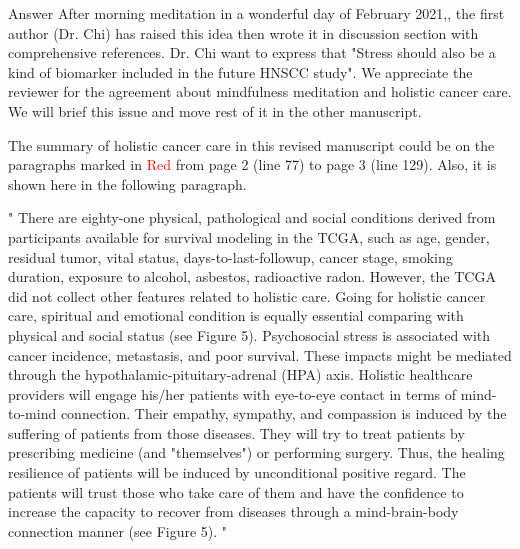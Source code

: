 \documentclass[preprint,12pt]{elsarticle}
\newenvironment{MyColorPar}[1]{%
    \leavevmode\color{#1}\ignorespaces%
}{%
}%
\begin{document}

\begin{MyColorPar}{blue}
Answer
After morning meditation in a wonderful day of February 2021,, the first author (Dr. Chi) has raised this idea then wrote it in discussion section with comprehensive references. Dr. Chi want to express that "Stress should also be a kind of biomarker included in the future HNSCC study".
We appreciate the reviewer for the agreement about mindfulness meditation and holistic cancer care. We will brief this issue and move rest of it in the other manuscript.

The summary of holistic cancer care in this revised manuscript could be on the paragraphs marked in \textcolor{red}{Red} from page 2 (line 77) to page 3 (line 129). Also, it is shown here in the following paragraph.

\begin{MyColorPar}{red}
"%
There are eighty-one physical, pathological and social conditions derived from participants available for survival modeling in the TCGA, %
such as age, gender, residual tumor, vital status, days-to-last-followup, cancer stage, smoking duration, exposure to alcohol, asbestos, radioactive radon. 
However, the TCGA did not collect other features related to holistic care.
Going for holistic cancer care\cite{Mehta2019}\cite{Iftikhar2021}, spiritual and emotional condition is equally essential comparing with physical and social status (see Figure 5).%
Psychosocial stress is associated with cancer incidence\cite{Lutgendorf2010}\cite{Powell2013}\cite{Iftikhar2021}, metastasis\cite{Lutgendorf2010}\cite{Moreno-Smith2010}\cite{Du2020}\cite{Xu2021}, and poor survival\cite{Chida2008}.
These impacts might be mediated through the hypothalamic-pituitary-adrenal (HPA) axis\cite{Hsiao2012}.
Holistic healthcare providers will engage his/her patients with eye-to-eye contact in terms of mind-to-mind connection. Their empathy, sympathy, and compassion is induced by the suffering of patients from those diseases. They will try to treat patients by prescribing medicine (and "themselves") or performing surgery.
Thus, the healing resilience of patients will be induced by unconditional positive regard. %
The patients will trust those who take care of them and have the confidence to increase the capacity to recover from diseases through a mind-brain-body connection manner (see Figure 5).%
"


\end{MyColorPar}
\end{MyColorPar}
\end{document}

